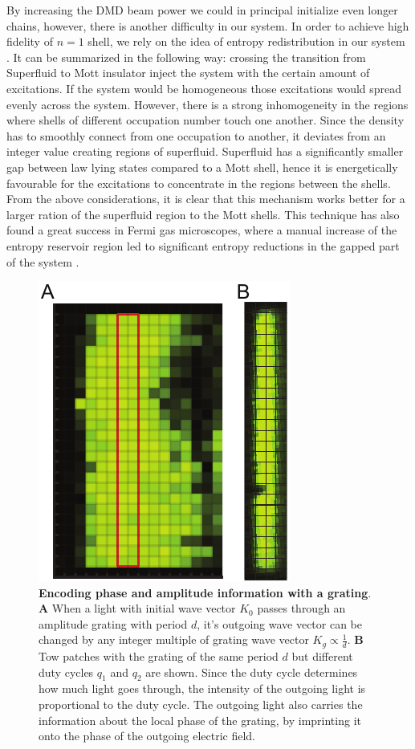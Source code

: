 By increasing the DMD beam power we could in principal initialize even longer chains, however, there is another difficulty in our system. In order to achieve high fidelity of $n=1$ shell, we rely on the idea of entropy redistribution in our system \cite{some entropy redistribution}. It can be summarized in the following way: crossing the transition from Superfluid to Mott insulator inject the system with the certain amount of excitations. If the system would be homogeneous those excitations would spread evenly across the system. However, there is a strong inhomogeneity in the regions where shells of different occupation number touch one another. Since the density has to smoothly connect from one occupation to another, it deviates from an integer value creating regions of superfluid. Superfluid has a significantly smaller gap between law lying states compared to a Mott shell, hence it is energetically favourable for the excitations to concentrate in the regions between the shells. From the above considerations, it is clear that this mechanism works better for a larger ration of the superfluid region to the Mott shells. This technique has also found a great success in Fermi gas microscopes, where a manual increase of the entropy reservoir region led to significant entropy reductions in the gapped part of the system \cite{Mazurenko2017, Chiu2018}.

\begin{figure}[t]
	\centering
	\includegraphics[scale=1]{figures/CTE_MI_box.pdf}
	\caption{{\bf Encoding phase and amplitude information with a grating}. {\bf A} When a light with initial wave vector $K_0$ passes through an amplitude grating with period $d$, it's outgoing wave vector can be changed by any integer multiple of grating wave vector $K_g\propto \frac{1}{d}$. {\bf B} Tow patches with the grating of the same period $d$ but different duty cycles $q_1$ and $q_2$ are shown. Since the duty cycle determines how much light goes through, the intensity of the outgoing light is proportional to the duty cycle. The outgoing light also carries the information about the local phase of the grating, by imprinting it onto the phase of the outgoing electric field.}
	\label{fig:CTE_MI_box}
\end{figure}

